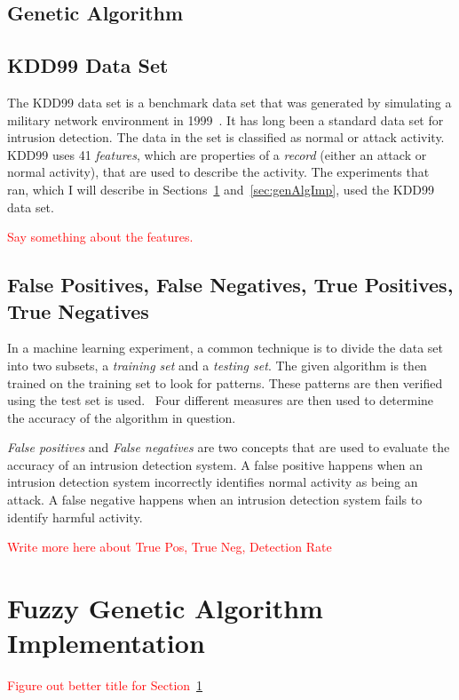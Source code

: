 \documentclass{sig-alternate}
\newcommand{\mycomment}[1]{\textcolor{red}{#1}}
\begin{document}
\subsection{Genetic Algorithm}





\subsection{KDD99 Data Set}
The KDD99 data set is a benchmark data set that was generated by simulating a military network environment in 1999~\cite{6559603}. It has long been a standard data set for intrusion detection. The data in the set is classified as normal or attack activity. KDD99 uses 41 \emph{features}, which are properties of a \emph{record} (either an attack or normal activity), that are used to describe the activity. The experiments that~\cite{6559603, DBLP:journals/corr/abs-1204-1336} ran, which I will describe in Sections~\ref{sec:fuzGenAlgImp} and~\ref{sec:genAlgImp}, used the KDD99 data set.

\mycomment{Say something about the features.}




\subsection{False Positives, False Negatives, True Positives, True Negatives}
\label{sec:PosNeg}
In a machine learning experiment, a common technique is to divide the data set into two subsets, a \emph{training set} and a \emph{testing set}. The given algorithm is then trained on the training set to look for patterns. These patterns are then verified using the test set is used.~\cite{bc1_ecindm} Four different measures are then used to determine the accuracy of the algorithm in question.

\emph{False positives} and \emph{False negatives} are two concepts that are used to evaluate the accuracy of an intrusion detection system. A false positive happens when an intrusion detection system incorrectly identifies normal activity as being an attack. A false negative happens when an intrusion detection system fails to identify harmful activity.~\cite{Liao201316}

\mycomment{Write more here about True Pos, True Neg, Detection Rate}




\section{Fuzzy Genetic Algorithm Implementation}
\label{sec:fuzGenAlgImp}
\mycomment{Figure out better title for Section~\ref{sec:fuzGenAlgImp}}
\end{document}

